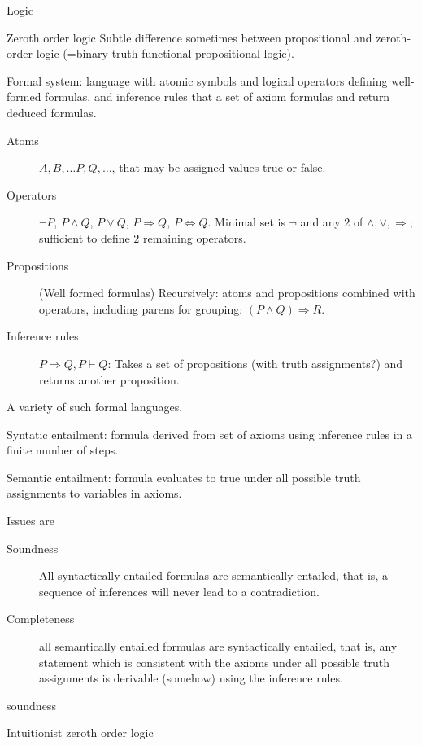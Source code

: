 \begin{plSection}{Logic}
\begin{plSection}{Zeroth order logic}
Subtle difference sometimes between propositional
and zeroth-order logic 
(=binary truth functional propositional logic).

Formal system:
language with atomic symbols
and logical operators defining well-formed formulas,
and inference rules that a set of axiom formulas 
and return deduced formulas.
\begin{description}
\item[Atoms]  $A, B, \ldots P, Q, \ldots$, 
that may be assigned values \textsf{true} or \textsf{false}.

\item[Operators] $\lnot P$, $P \wedge Q$, $P \vee Q$, 
$P \Rightarrow Q$, $P \Leftrightarrow Q$. 
Minimal set is $\lnot$ and 
any $2$ of  $\wedge, \vee, \Rightarrow$;
sufficient to define $2$ remaining operators.

\item[Propositions] (Well formed formulas)
Recursively: atoms and propositions combined with operators,
including parens for grouping: $(P \wedge Q) \Rightarrow R$.

\item[Inference rules] ${P \Rightarrow Q, P} \vdash Q$:
Takes a set of propositions (with truth assignments?)
and returns another proposition.
\end{description}

A variety of such formal languages.

Syntatic entailment: formula derived from set of axioms 
using inference rules in a finite number of steps.

Semantic entailment: formula evaluates to \textsf{true}
under all possible truth assignments to variables
in axioms.

Issues are 
\begin{description}
\item[Soundness]
All syntactically entailed formulas
are semantically entailed, that is,
a sequence of inferences will never lead to a contradiction.

\item[Completeness] 
all semantically entailed formulas 
are syntactically entailed, that is,
any statement which is consistent with the axioms under all 
possible truth assignments is derivable (somehow) using the 
inference rules.
\end{description}soundness 

\begin{plSection}{Intuitionist zeroth order logic}
\label{sec:Intuitionist_zeroth_order_logic}


\end{plSection}
\end{plSection}
\end{plSection}
